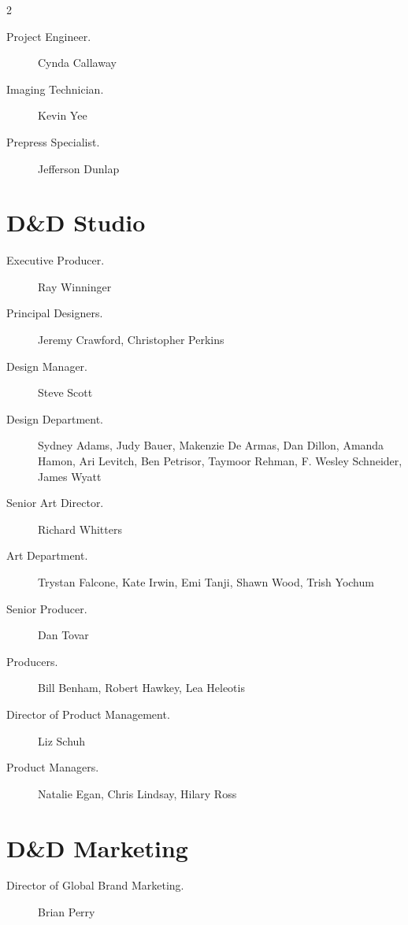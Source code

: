 \documentclass[10pt,a4paper,twoside,bg=print,twocolumn,openany,nodeprecatedcode]{dndbook}
\begin{document}
\begin{description}
\begin{multicols}{2}
\begin{description}
\item[Project Engineer.]
Cynda Callaway

\item[Imaging Technician.]
Kevin Yee

\item[Prepress Specialist.]
Jefferson Dunlap

\end{description}

\section{D\&D Studio}

\begin{description}
\item[Executive Producer.]
Ray Winninger

\item[Principal Designers.]
Jeremy Crawford, Christopher Perkins

\item[Design Manager.]
Steve Scott

\item[Design Department.]
Sydney Adams, Judy Bauer, Makenzie De Armas, Dan Dillon, Amanda Hamon, Ari Levitch, Ben Petrisor, Taymoor Rehman, F. Wesley Schneider, James Wyatt

\item[Senior Art Director.]
Richard Whitters

\item[Art Department.]
Trystan Falcone, Kate Irwin, Emi Tanji, Shawn Wood, Trish Yochum

\item[Senior Producer.]
Dan Tovar

\item[Producers.]
Bill Benham, Robert Hawkey, Lea Heleotis

\item[Director of Product Management.]
Liz Schuh

\item[Product Managers.]
Natalie Egan, Chris Lindsay, Hilary Ross

\end{description}

\section{D\&D Marketing}

\begin{description}
\item[Director of Global Brand Marketing.]
Brian Perry


\end{description}
\end{multicols}
\end{description}
\end{document}
